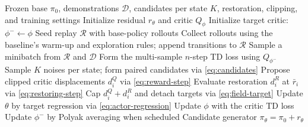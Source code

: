 \begin{algorithm}[t]
  \caption{CAST: online residual fine-tuning}
  \label{alg:cast}
  \small
  \begin{algorithmic}[1]
    \Require Frozen base $\pi_0$, demonstrations $\mathcal D$, candidates per
      state $K$, restoration, clipping, and training settings
    \State Initialize residual $r_\theta$ and critic $Q_\phi$
    \State Initialize target critic: $\phi^-\gets\phi$
    \State Seed replay $\mathcal R$ with base-policy rollouts
      \State Collect rollouts using the baseline's warm-up and exploration rules; append transitions to $\mathcal R$
        \State Sample a minibatch from $\mathcal R$ and $\mathcal D$
        \State Form the multi-sample $n$-step TD loss using $Q_{\phi^-}$
          \State Sample $K$ noises per state; form paired candidates via \eqref{eq:candidates}
          \State Propose clipped critic displacements $d_i^Q$ via \eqref{eq:reward-step}
          \State Evaluate restoration $d_i^R$ at $\bar r_i$ via \eqref{eq:restoring-step}
          \State Cap $d_i^Q+d_i^R$ and detach targets via \eqref{eq:field-target}
          \State Update $\theta$ by target regression via \eqref{eq:actor-regression}
        \EndIf
        \State Update $\phi$ with the critic TD loss
        \State Update $\phi^-$ by Polyak averaging when scheduled
      \EndFor
    \EndFor
    \State \Return Candidate generator $\pi_\theta=\pi_0+r_\theta$
  \end{algorithmic}
\end{algorithm}
